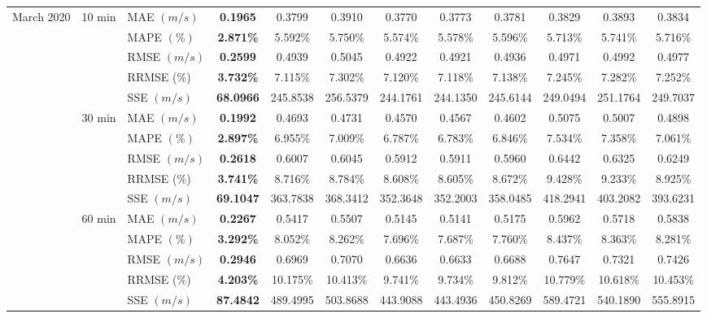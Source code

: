 {\begin{longtable}[htb!]{lllccccccccc}
March 2020 & \multicolumn{1}{c}{10 min} & MAE {$(m/s)$} & \textbf{0.1965} & 0.3799 & 0.3910 & 0.3770 & 0.3773 & 0.3781 & {0.3829} & {0.3893} & {0.3834} \\
&  & MAPE {$(\%)$} & \textbf{2.871\%} & 5.592\% & 5.750\% & 5.574\% & 5.578\% & 5.596\% & {5.713\%} & {5.741\%} & {5.716\%} \\
&  & RMSE {$(m/s)$} & \textbf{0.2599} & 0.4939 & 0.5045 & 0.4922 & 0.4921 & 0.4936 & {0.4971} & {0.4992} & {0.4977} \\
&  & {RRMSE {(\%)}} & {\textbf{3.732\%}} & {7.115\%} & {7.302\%} & {7.120\%} & {7.118\%} & {7.138\%} & {7.245\%} & {7.282\%} & {7.252\%} \\
&  & {SSE {$(m/s)$}} & {\textbf{68.0966}} & {245.8538} & {256.5379} & {244.1761} & {244.1350} & {245.6144} & {249.0494} & {251.1764} & {249.7037} \\
& \multicolumn{1}{c}{30 min} & MAE {$(m/s)$} & \textbf{0.1992} & 0.4693 & 0.4731 & 0.4570 & 0.4567 & 0.4602 & {0.5075} & {0.5007} & {0.4898} \\
&  & MAPE {$(\%)$} & \textbf{2.897\%} & 6.955\% & 7.009\% & 6.787\% & 6.783\% & 6.846\% & {7.534\%} & {7.358\%} & {7.061\%} \\
&  & RMSE {$(m/s)$} & \textbf{0.2618} & 0.6007 & 0.6045 & 0.5912 & 0.5911 & 0.5960 & {0.6442} & {0.6325} & {0.6249} \\
&  & {RRMSE {(\%)}} & {\textbf{3.741\%}} & {8.716\%} & {8.784\%} & {8.608\%} & {8.605\%} & {8.672\%} & {9.428\%} & {9.233\%} & {8.925\%} \\
&  & {SSE {$(m/s)$}} & {\textbf{69.1047}} & {363.7838} & {368.3412} & {352.3648} & {352.2003} & {358.0485} & {418.2941} & {403.2082} & {393.6231} \\
& \multicolumn{1}{c}{60 min} & MAE {$(m/s)$} & \textbf{0.2267} & 0.5417 & 0.5507 & 0.5145 & 0.5141 & 0.5175 & {0.5962} & {0.5718} & {0.5838} \\
&  & MAPE {$(\%)$} & \textbf{3.292\%} & 8.052\% & 8.262\% & 7.696\% & 7.687\% & 7.760\% & {8.437\%} & {8.363\%} & {8.281\%} \\
&  & RMSE {$(m/s)$} & \textbf{0.2946} & 0.6969 & 0.7070 & 0.6636 & 0.6633 & 0.6688 & {0.7647} & {0.7321} & {0.7426} \\
&  & {RRMSE {(\%)}} & {\textbf{4.203\%}} & {10.175\%} & {10.413\%} & {9.741\%} & {9.734\%} & {9.812\%} & {10.779\%} & {10.618\%} & {10.453\%} \\
&  & {SSE {$(m/s)$}} & {\textbf{87.4842}} & {489.4995} & {503.8688} & {443.9088} & {443.4936} & {450.8269} & {589.4721} & {540.1890} & {555.8915} \\ \hline

\end{longtable}}
